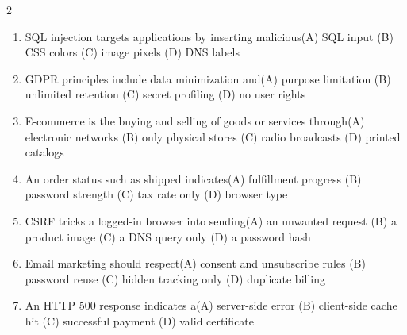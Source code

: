 \documentclass[a4paper]{article}
\begin{document}
\begin{multicols*}{2}
\begin{enumerate}
\item SQL injection targets applications by inserting malicious\newline\hspace*{0.6em}(A) SQL input \quad (B) CSS colors \newline\hspace*{0.6em}(C) image pixels \quad (D) DNS labels
\item GDPR principles include data minimization and\newline\hspace*{0.6em}(A) purpose limitation \quad (B) unlimited retention \newline\hspace*{0.6em}(C) secret profiling \quad (D) no user rights
\item E-commerce is the buying and selling of goods or services through\newline\hspace*{0.6em}(A) electronic networks \quad (B) only physical stores \newline\hspace*{0.6em}(C) radio broadcasts \quad (D) printed catalogs
\item An order status such as shipped indicates\newline\hspace*{0.6em}(A) fulfillment progress \quad (B) password strength \newline\hspace*{0.6em}(C) tax rate only \quad (D) browser type
\item CSRF tricks a logged-in browser into sending\newline\hspace*{0.6em}(A) an unwanted request \quad (B) a product image \newline\hspace*{0.6em}(C) a DNS query only \quad (D) a password hash
\item Email marketing should respect\newline\hspace*{0.6em}(A) consent and unsubscribe rules \quad (B) password reuse \newline\hspace*{0.6em}(C) hidden tracking only \quad (D) duplicate billing
\item An HTTP 500 response indicates a\newline\hspace*{0.6em}(A) server-side error \quad (B) client-side cache hit \newline\hspace*{0.6em}(C) successful payment \quad (D) valid certificate

\end{enumerate}
\end{multicols*}
\end{document}
